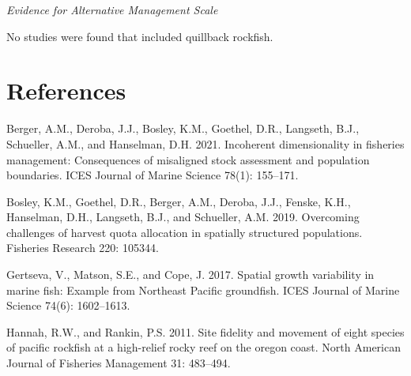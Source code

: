 \documentclass[11pt,
  english,
  letterpaper,
]{article}
\begin{document}
\leavevmode\tagmcend\tagstructend\par


\emph{Evidence for Alternative Management Scale}

\leavevmode\tagmcend\tagstructend\par


No studies were found that included quillback rockfish.

\leavevmode\tagmcend\tagstructend\par

\clearpage

\clearpage


\hypertarget{references}{%
\section{References}\label{references}}

\leavevmode\tagmcend\tagstructend


\hypertarget{refs}{}
\leavevmode\hypertarget{ref-berger_incoherent_2021}{}%
Berger, A.M., Deroba, J.J., Bosley, K.M., Goethel, D.R., Langseth, B.J., Schueller, A.M., and Hanselman, D.H. 2021. Incoherent dimensionality in fisheries management: Consequences of misaligned stock assessment and population boundaries. ICES Journal of Marine Science 78(1): 155--171.

\leavevmode\hypertarget{ref-bosley_overcoming_2019}{}%
Bosley, K.M., Goethel, D.R., Berger, A.M., Deroba, J.J., Fenske, K.H., Hanselman, D.H., Langseth, B.J., and Schueller, A.M. 2019. Overcoming challenges of harvest quota allocation in spatially structured populations. Fisheries Research 220: 105344.

\leavevmode\hypertarget{ref-gertseva_spatial_2017}{}%
Gertseva, V., Matson, S.E., and Cope, J. 2017. Spatial growth variability in marine fish: Example from Northeast Pacific groundfish. ICES Journal of Marine Science 74(6): 1602--1613.

\leavevmode\hypertarget{ref-HannahandRankin_rockfish_site_fidelity_2011}{}%
Hannah, R.W., and Rankin, P.S. 2011. Site fidelity and movement of eight species of pacific rockfish at a high-relief rocky reef on the oregon coast. North American Journal of Fisheries Management 31: 483--494.
\end{document}
